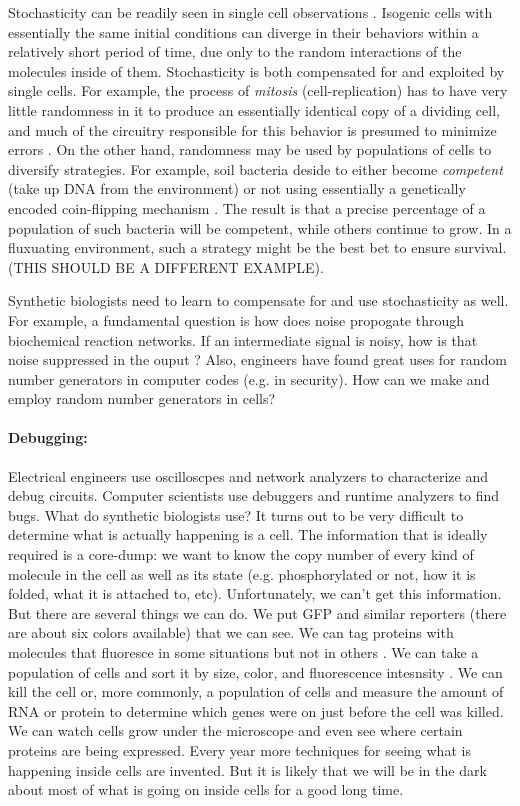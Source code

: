 Stochasticity can be readily seen in single cell observations
\cite{elowitz-single-cell}. Isogenic cells with essentially the same
initial conditions can diverge in their behaviors within a relatively
short period of time, due only to the random interactions of the
molecules inside of them. Stochasticity is both compensated for and
exploited by single cells. For example, the process of {\em mitosis}
(cell-replication) has to have very little randomness in it to produce
an essentially identical copy of a dividing cell, and much of the
circuitry responsible for this behavior is presumed to minimize errors
\cite{error-correction-in-mitosis}. On the other hand, randomness may
be used by populations of cells to diversify strategies. For example,
soil bacteria deside to either become {\em competent} (take up DNA
from the environment) or not using essentially a genetically encoded
coin-flipping mechanism \cite{elowitz-b-sub}. The result is that a
precise percentage of a population of such bacteria will be competent,
while others continue to grow. In a fluxuating environment, such a
strategy might be the best bet to ensure survival. (THIS SHOULD BE A
DIFFERENT EXAMPLE). 

Synthetic biologists need to learn to compensate for and use
stochasticity as well. For example, a fundamental question is how does
noise propogate through biochemical reaction networks. If an
intermediate signal is noisy, how is that noise suppressed in the
ouput \cite{avano-noise-cascade}? Also, engineers have found great
uses for random number generators in computer codes (e.g. in
security). How can we make and employ random number generators in
cells?

\paragraph{Debugging:} Electrical engineers use oscilloscpes and
network analyzers to characterize and debug circuits. Computer
scientists use debuggers and runtime analyzers to find bugs. What do
synthetic biologists use? It turns out to be very difficult to
determine what is actually happening is a cell. The information that
is ideally required is a core-dump: we want to know the copy number of
every kind of molecule in the cell as well as its state
(e.g. phosphorylated or not, how it is folded, what it is attached to,
etc). Unfortunately, we can't get this information. But there are
several things we can do. We put GFP and similar reporters (there are
about six colors available) that we can see. We can tag proteins with
molecules that fluoresce in some situations but not in others
\cite{msb-fre-study}. We can take a population of cells and sort it by
size, color, and fluorescence intesnsity \cite{facs}. We can kill the
cell or, more commonly, a population of cells and measure the amount
of RNA or protein to determine which genes were on just before the
cell was killed. We can watch cells grow under the microscope and even
see where certain proteins are being expressed. Every year more
techniques for seeing what is happening inside cells are invented. But
it is likely that we will be in the dark about most of what is going
on inside cells for a good long time. 

